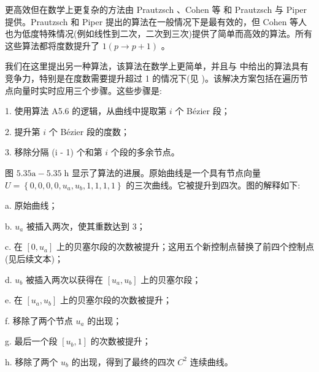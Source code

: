\documentclass[../main.tex]{subfiles}
\begin{document}
更高效但在数学上更复杂的方法由 Prautzsch \cite{Prau84}、Cohen 等 \cite{Cohe85} 和 Prautzsch 与 Piper \cite{Prau91} 提供。Prautzsch 和 Piper 提出的算法在一般情况下是最有效的，但 Cohen 等人也为低度特殊情况(例如线性到二次，二次到三次)提供了简单而高效的算法。所有这些算法都将度数提升了 \(1\left( {p \rightarrow  p + 1}\right)\) 。



我们在这里提出另一种算法，该算法在数学上更简单，并且与 \cite{Prau91} 中给出的算法具有竞争力，特别是在度数需要提升超过 1 的情况下(见 \cite{Pieg94})。该解决方案包括在遍历节点向量时实时应用三个步骤。这些步骤是:

1. 使用算法 A5.6 的逻辑，从曲线中提取第 \(i\) 个 Bézier 段；

2. 提升第 \(i\) 个 Bézier 段的度数；

3. 移除分隔 (i - 1) 个和第 \(i\) 个段的多余节点。

图 \({5.35}\mathrm{a} - {5.35}\mathrm{\;h}\) 显示了算法的进展。原始曲线是一个具有节点向量 \(U = \left\{  {0,0,0,0,{u}_{a},{u}_{b},1,1,1,1}\right\}\) 的三次曲线。它被提升到四次。图的解释如下:

a. 原始曲线；

b. \({u}_{a}\) 被插入两次，使其重数达到 3；





c. 在 \(\left\lbrack  {0,{u}_{a}}\right\rbrack\) 上的贝塞尔段的次数被提升；这用五个新控制点替换了前四个控制点(见后续文本)；

d. \({u}_{b}\) 被插入两次以获得在 \(\left\lbrack  {{u}_{a},{u}_{b}}\right\rbrack\) 上的贝塞尔段；

e. 在 \(\left\lbrack  {{u}_{a},{u}_{b}}\right\rbrack\) 上的贝塞尔段的次数被提升；

f. 移除了两个节点 \({u}_{a}\) 的出现；

g. 最后一个段 \(\left\lbrack  {{u}_{b},1}\right\rbrack\) 的次数被提升；

h. 移除了两个 \({u}_{b}\) 的出现，得到了最终的四次 \({C}^{2}\) 连续曲线。
\end{document}
